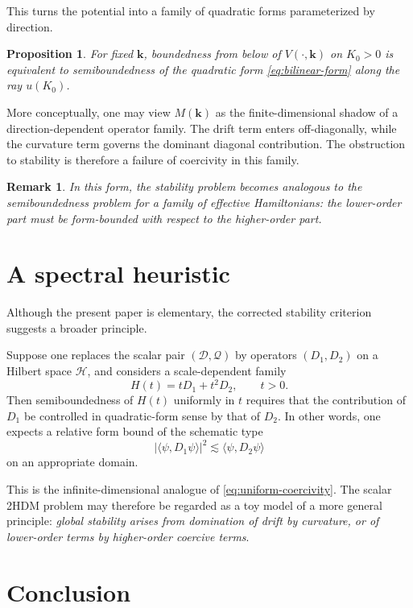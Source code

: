\documentclass[11pt,a4paper]{article}
\newtheorem{proposition}[definition]{Proposition}
\newtheorem{remark}[definition]{Remark}
\newcommand{\kk}{\bm{k}}
\newcommand{\D}{\mathcal{D}}
\newcommand{\Q}{\mathcal{Q}}
\begin{document}
	This turns the potential into a family of quadratic forms parameterized by direction.
	
	\begin{proposition}
		For fixed \(\kk\), boundedness from below of \(V(\cdot,\kk)\) on \(K_0>0\) is equivalent to semiboundedness of the quadratic form \eqref{eq:bilinear-form} along the ray \(u(K_0)\).
	\end{proposition}
	
	More conceptually, one may view \(M(\kk)\) as the finite-dimensional shadow of a direction-dependent operator family. The drift term enters off-diagonally, while the curvature term governs the dominant diagonal contribution. The obstruction to stability is therefore a failure of coercivity in this family.
	
	\begin{remark}
		In this form, the stability problem becomes analogous to the semiboundedness problem for a family of effective Hamiltonians: the lower-order part must be form-bounded with respect to the higher-order part.
	\end{remark}
	
	\section{A spectral heuristic}
	
	Although the present paper is elementary, the corrected stability criterion suggests a broader principle.
	
	Suppose one replaces the scalar pair \((\D,\Q)\) by operators \((D_1,D_2)\) on a Hilbert space \(\mathcal{H}\), and considers a scale-dependent family
	\[
	H(t)=tD_1+t^2D_2,\qquad t>0.
	\]
	Then semiboundedness of \(H(t)\) uniformly in \(t\) requires that the contribution of \(D_1\) be controlled in quadratic-form sense by that of \(D_2\). In other words, one expects a relative form bound of the schematic type
	\[
	|\langle \psi,D_1\psi\rangle|^2
	\lesssim
	\langle \psi,D_2\psi\rangle
	\]
	on an appropriate domain.
	
	This is the infinite-dimensional analogue of \eqref{eq:uniform-coercivity}. The scalar 2HDM problem may therefore be regarded as a toy model of a more general principle: \emph{global stability arises from domination of drift by curvature, or of lower-order terms by higher-order coercive terms}.
	
	\section{Conclusion}
	
\end{document}
